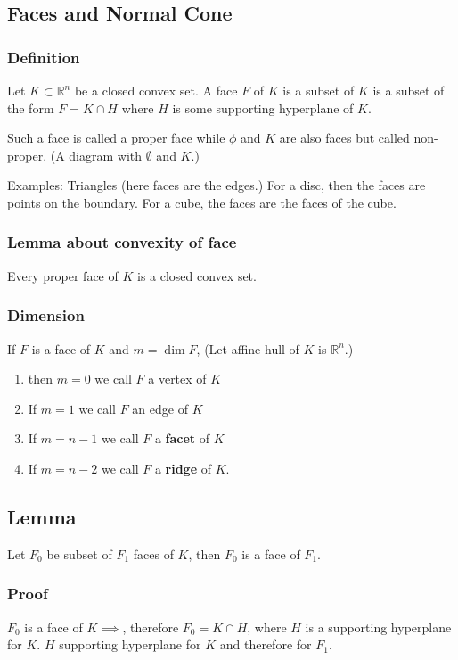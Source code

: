 \documentclass[11pt]{article}
\def\R{\mathbb{R}}
\begin{document}
\subsection{Faces and Normal Cone}
\label{sec:orgcbd4856}

\subsubsection{Definition}
\label{sec:org9aafe80}
Let \(K\subset \R^n\) be a closed convex set. A face \(F\) of \(K\) is a subset of
\(K\) is a subset of the form \(F = K \cap H\) where \(H\) is some supporting
hyperplane of \(K\). 

Such a face is called a proper face while \(\phi\) and \(K\) are also faces but
called non-proper. (A diagram with \(\emptyset\) and \(K\).)

Examples: Triangles (here faces are the edges.) For a disc, then the faces
are points on the boundary. For a cube, the faces are the faces of the cube.
\subsubsection{Lemma about convexity of face}
\label{sec:orgb0c947b}
Every proper face of \(K\) is a closed convex set.
\subsubsection{Dimension}
\label{sec:orgca53bb3}
If \(F\) is a face of \(K\) and \(m=\dim F\), (Let affine hull of \(K\) is \(\R^n\).)
\begin{enumerate}
\item then \(m=0\) we call \(F\) a vertex of \(K\)
\item If \(m=1\) we call \(F\) an edge of \(K\)
\item If \(m=n-1\) we call \(F\) a \textbf{facet} of \(K\)
\item If \(m=n-2\) we call \(F\) a \textbf{ridge} of \(K\).
\end{enumerate}
\subsection{Lemma}
\label{sec:org4b7aed8}
Let \(F_0\) be subset of \(F_1\) faces of \(K\), then \(F_0\) is a face of \(F_1\).
\subsubsection{Proof}
\label{sec:org29da039}
\(F_0\) is a face of \(K \implies\), therefore \(F_0 = K \cap H\), where \(H\) is a
supporting hyperplane for \(K\). \(H\) supporting hyperplane for \(K\) and
therefore for \(F_1\).
\end{document}
